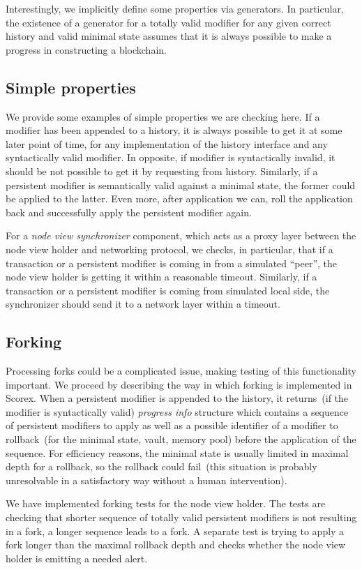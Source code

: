Interestingly, we implicitly define some properties via generators. In particular, the existence of a generator for a totally valid modifier for any given correct history and valid minimal state assumes that it is always possible to make a progress in constructing a blockchain.

\subsection{Simple properties}
\label{sec:simple-props}

We provide some examples of simple properties we are checking here. If a modifier has been appended to a history, it is always possible to get it at some later point of time, for any implementation of the history interface and any syntactically valid modifier. In opposite, if modifier is syntactically invalid, it should be not possible to get it by requesting from history. Similarly, if a persistent modifier is semantically valid against a minimal state, the former could be applied to the latter. Even more, after application we can, roll the application back and successfully apply the persistent modifier again.  

For a {\em node view synchronizer} component, which acts as a proxy layer between the node view holder and networking protocol, we checks, in particular, that if a transaction or a persistent modifier is coming in from a simulated ``peer'', the node view holder is getting it within a reasonable timeout. Similarly, if a transaction or a persistent modifier is coming from simulated local side, the synchronizer should send it to a network layer within a timeout.

\subsection{Forking}
\label{sec:forking}

Processing forks could be a complicated issue, making testing of this functionality important. We proceed by describing the way in which forking is implemented in Scorex. When a persistent modifier is appended to the history, it returns~(if the modifier is syntactically valid) {\em progress info} structure which contains a sequence of persistent modifiers to apply as well as a possible identifier of a modifier to rollback~(for the minimal state, vault, memory pool) before the application of the sequence. For efficiency reasons, the minimal state is usually limited in maximal depth for a rollback, so the rollback could fail~(this situation is probably unresolvable in a satisfactory way without a human intervention). 

We have implemented forking tests for the node view holder. The tests are checking that shorter sequence of totally valid persistent modifiers is not resulting in a fork, a longer sequence leads to a fork. A separate test is trying to apply a fork longer than the maximal rollback depth and checks whether the node view holder is emitting a needed alert.
